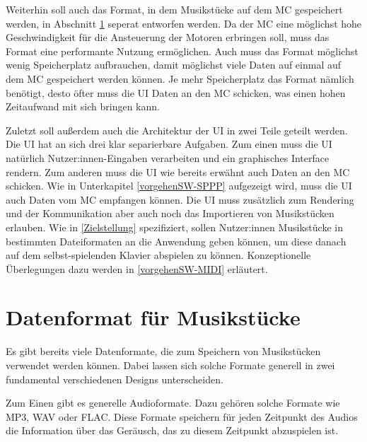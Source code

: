 Weiterhin soll auch das Format, in dem Musikstücke auf dem \ac{MC} gespeichert werden, in Abschnitt \ref{vorgehenSW-PIDI} seperat entworfen werden.
Da der \ac{MC} eine möglichst hohe Geschwindigkeit für die Ansteuerung der Motoren erbringen soll, muss das Format eine performante Nutzung ermöglichen.
Auch muss das Format möglichst wenig Speicherplatz aufbrauchen, damit möglichst viele Daten auf einmal auf dem \ac{MC} gespeichert werden können.
Je mehr Speicherplatz das Format nämlich benötigt, desto öfter muss die \ac{UI} Daten an den \ac{MC} schicken, was einen hohen Zeitaufwand mit sich bringen kann.

Zuletzt soll außerdem auch die Architektur der \ac{UI} in zwei Teile geteilt werden.
Die \ac{UI} hat an sich drei klar separierbare Aufgaben.
Zum einen muss die \ac{UI} natürlich Nutzer:innen-Eingaben verarbeiten und ein graphisches Interface rendern.
Zum anderen muss die \ac{UI} wie bereits erwähnt auch Daten an den \ac{MC} schicken.
Wie in Unterkapitel \ref{vorgehenSW-SPPP} aufgezeigt wird, muss die \ac{UI} auch Daten vom \ac{MC} empfangen können.
Die UI muss zusätzlich zum Rendering und der Kommunikation aber auch noch das Importieren von Musikstücken erlauben.
Wie in \ref{Zielstellung} spezifiziert, sollen Nutzer:innen Musikstücke in bestimmten Dateiformaten an die Anwendung geben können, um diese danach auf dem selbst-spielenden Klavier abspielen zu können.
Konzeptionelle Überlegungen dazu werden in \ref{vorgehenSW-MIDI} erläutert.


\section{Datenformat für Musikstücke} \label{vorgehenSW-PIDI}

Es gibt bereits viele Datenformate, die zum Speichern von Musikstücken verwendet werden können. Dabei lassen sich solche Formate generell in zwei fundamental verschiedenen Designs unterscheiden.

Zum Einen gibt es generelle Audioformate. Dazu gehören solche Formate wie MP3, WAV oder FLAC.
Diese Formate speichern für jeden Zeitpunkt des Audios die Information über das Geräusch, das zu diesem Zeitpunkt abzuspielen ist.

